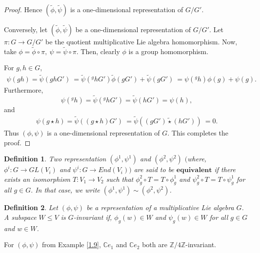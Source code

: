 \documentclass[10 pt,oneside,reqno,a4paper]{amsart}
\newtheorem{definition}{Definition}[section]
\numberwithin{equation}{section}
\newcommand{\field}[1]{\mathbb{#1}}          \newcommand{\Q}{\field{Q}}
\newcommand{\C}{\field{C}}                   \newcommand{\A}{\field{A}}
\begin{document}
\begin{proof}
 Hence $(\widetilde{\phi},\widetilde{\psi})$ is a one-dimensional representation of $G/G'$.

Conversely, let $(\widetilde{\phi},\widetilde{\psi})$ be a one-dimensional representation of $G/G'$. Let $\pi: G \to G/G'$ be the quotient multiplicative Lie algebra homomorphism. Now, take
$\phi=\widetilde{\phi}\circ\pi,
~\psi=\widetilde{\psi}\circ\pi.$ Then, clearly $\phi$ is a group homomorphism.

For $g,h\in G$,
\begin{align*}
\psi(gh)
=\widetilde{\psi}(ghG')\
=\widetilde{\psi}({}^{g}hG')\widetilde{\phi}(gG')
+\widetilde{\psi}(gG')\
=\psi({}^{g}h)\phi(g)+\psi(g).
\end{align*}
Furthermore,
\[
\psi({}^{g}h)
=\widetilde{\psi}({}^{g}hG')
=\widetilde{\psi}(hG')
=\psi(h),
\]
and
\begin{align*}
\psi(g\star h)
=\widetilde{\psi}((g\star h)G')\
=\widetilde{\psi}((gG')\widetilde{\star}(hG'))\
=0.
\end{align*}
Thus $(\phi,\psi)$ is a one-dimensional representation of $G$. This completes the proof.
\end{proof}





\begin{definition}
     Two representation $(\phi^1,\psi^1)$ and $(\phi^2, \psi^2)$ $($where, $\phi^{i} : G \rightarrow GL(V_{i})$ and $\psi^{i}: G \rightarrow End(V_{i}))$ are said to be $\textbf{equivalent}$ if  there exists an isomorphism $T : V_{1} \rightarrow V_{2}$ such that $\phi^2_{g}\circ T=T \circ \phi^1_g$ and $\psi^2_{g}\circ T=T \circ \psi^1_g$ for all $g\in G.$ In that case, we write $(\phi^1,\psi^1) \sim (\phi^2, \psi^2)$.
\end{definition}


\begin{definition}
 Let $(\phi,\psi)$ be a representation of a multiplicative Lie algebra $G$. A subspace $W\leq V$ is $G$-invariant if, $\phi_g(w)\in W$ and $\psi_g(w)\in W$ for all $g\in G$ and $w\in W$.
\end{definition}

For $(\phi,\psi)$ from Example \ref{1.9}, $\C e_1$ and $\C e_2$ both are $\mathbb{Z}/4\mathbb{Z}$-invariant.
\end{document}
